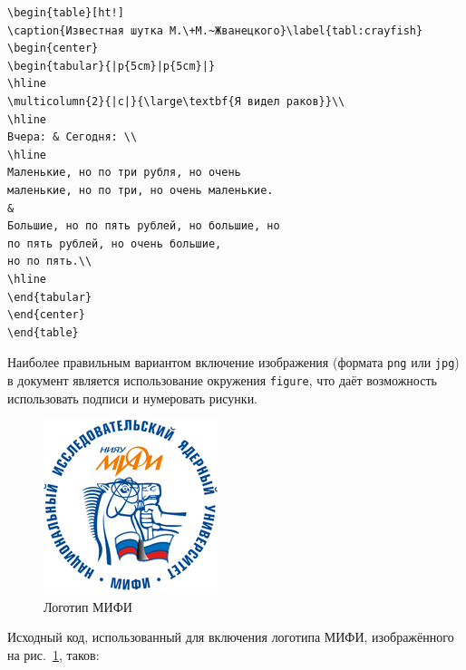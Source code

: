 \begin{small}
\begin{verbatim}
\begin{table}[ht!]
\caption{Известная шутка М.\+М.~Жванецкого}\label{tabl:crayfish}
\begin{center}
\begin{tabular}{|p{5cm}|p{5cm}|}
\hline
\multicolumn{2}{|c|}{\large\textbf{Я видел раков}}\\
\hline
Вчера: & Сегодня: \\
\hline
Маленькие, но по три рубля, но очень
маленькие, но по три, но очень маленькие.
&
Большие, но по пять рублей, но большие, но
по пять рублей, но очень большие,
но по пять.\\
\hline
\end{tabular}
\end{center}
\end{table}
\end{verbatim}
\end{small}

Наиболее правильным вариантом включение изображения (формата \verb|png| или
\verb|jpg|)
в документ является использование окружения \verb|figure|, что
даёт возможность использовать подписи и нумеровать рисунки.

\begin{figure}[ht!]
\begin{center}
\includegraphics[scale=0.6]{images/mephi_logo}
\end{center}
\vspace*{-8mm}
\caption{Логотип МИФИ}\label{fig:mephi_logo}
\end{figure}

\newpage

Исходный код, использованный для включения логотипа МИФИ,
изображённого на рис.~\ref{fig:mephi_logo}, таков:

